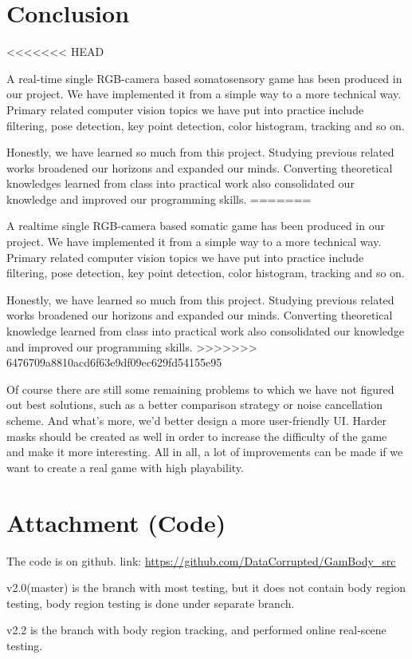 \documentclass[11pt,twocolumn,letterpaper]{article}
\begin{document}
\section{Conclusion}
<<<<<<< HEAD
    \par A real-time single RGB-camera based somatosensory game has been produced in our project. We have implemented it from a simple way to a more technical way. Primary related computer vision topics we have put into practice include filtering, pose detection, key point detection, color histogram, tracking and so on.
    \par Honestly, we have learned so much from this project. Studying previous related works broadened our horizons and expanded our minds. Converting theoretical knowledges learned from class into practical work also consolidated our knowledge and improved our programming skills.
=======
    \par A realtime single RGB-camera based somatic game has been produced in our project. We have implemented it from a simple way to a more technical way. Primary related computer vision topics we have put into practice include filtering, pose detection, key point detection, color histogram, tracking and so on.
    \par Honestly, we have learned so much from this project. Studying previous related works broadened our horizons and expanded our minds. Converting theoretical knowledge learned from class into practical work also consolidated our knowledge and improved our programming skills.
>>>>>>> 6476709a8810acd6f63e9df09ec629fd54155e95
    \par Of course there are still some remaining problems to which we have not figured out best solutions, such as a better comparison strategy or noise cancellation scheme. And what's more, we'd better design a more user-friendly UI. Harder masks should be created as well in order to increase the difficulty of the game and make it more interesting. All in all, a lot of improvements can be made if we want to create a real game with high playability.

\section{Attachment (Code)}
\par
The code is on github. link: \url{https://github.com/DataCorrupted/GamBody_src}
\par
v2.0(master) is the branch with most testing, but it does not contain body region testing, body region testing is done under separate branch.
\par
v2.2 is the branch with body region tracking, and performed online real-scene testing.
{\small


}
\end{document}
